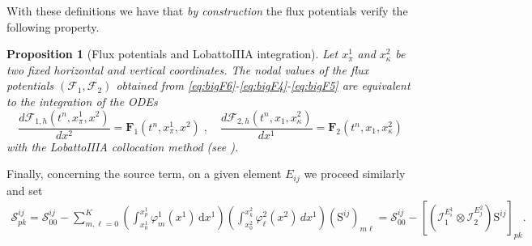 \documentclass[a4paper,10pt]{article}
\newtheorem{proposition}[theorem]{Proposition}
\begin{document}
With these definitions we have that \emph{by construction} the flux potentials verify the following property.
\begin{proposition}[Flux potentials and LobattoIIIA integration]\label{prop:Lobatto_integration}  Let $x^1_{\pi}$ and $x^2_{\kappa}$ be two fixed horizontal and vertical
coordinates. The nodal values of the flux potentials $(\mathcal{F}_1,\mathcal{F}_2)$ obtained from
\eqref{eq:bigF6}-\eqref{eq:bigF4}-\eqref{eq:bigF5} are equivalent to the integration of the ODEs
\begin{equation}\label{eq:bigF7}
\dfrac{d\mathcal{F}_{1,h}(t^n,x^1_{\pi},x^2)}{dx^2} = \mathbf{F}_1(t^n,x^1_{\pi},x^2) \;,\quad
\dfrac{d\mathcal{F}_{2,h}(t^n,x_{1},x^2_{\kappa})}{dx^1} = \mathbf{F}_2(t^n,x_{1},x^2_{\kappa})
\end{equation}
with the  LobattoIIIA collocation method (see \cite[Chapter II.7]{Hairer1993}).
\end{proposition}

Finally, concerning the source term, on a given element $E_{ij}$ we proceed similarly and   set
\begin{equation}\label{eq:bigF8}
\begin{split}
\mathcal{S}^{ij}_{pk} = \mathcal{S}^{ij}_{00}  - \sum_{m,  \ell=0}^K 
\left(\int_{x^1_{0}}^{x^1_{p}} \varphi^1_m(x^1)  \,\mathrm{d}x^1 \right) 
\left(\int_{x^2_{0}}^{x^2_{k}} \varphi^2_\ell(x^2)  \,dx^1\right) 
( \mathrm{S}^{ij})_{m \ell} = \mathcal{S}^{ij}_{00} -[(\mathcal{I}_1^{E_i^{1}} \otimes \mathcal{I}_2^{E_j^{2}}    )\mathrm{S}^{ij}]_{pk}.
\end{split}
\end{equation}
\end{document}
